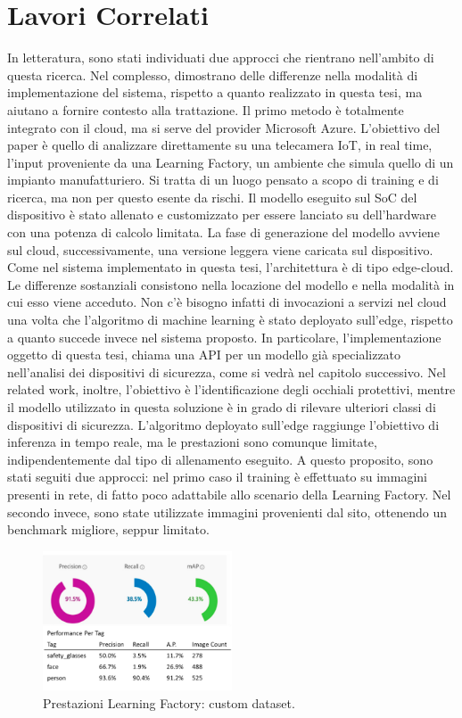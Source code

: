 \section{Lavori Correlati}

In letteratura, sono stati individuati due approcci che rientrano nell'ambito di questa ricerca. Nel complesso, dimostrano delle differenze nella modalità di implementazione del sistema, rispetto a quanto realizzato in questa tesi, ma aiutano a fornire contesto alla trattazione. Il primo metodo \cite{b7edgeppe} è totalmente integrato con il cloud, ma si serve del provider Microsoft Azure. L'obiettivo del paper è quello di analizzare direttamente su una telecamera IoT, in real time, l'input proveniente da una Learning Factory, un ambiente che simula quello di un impianto manufatturiero. Si tratta di un luogo pensato a scopo di training e di ricerca, ma non per questo esente da rischi. Il modello eseguito sul SoC del dispositivo è stato allenato e customizzato per essere lanciato su dell'hardware con una potenza di calcolo limitata. La fase di generazione del modello avviene sul cloud, successivamente, una versione leggera viene caricata sul dispositivo. Come nel sistema implementato in questa tesi, l'architettura è di tipo edge-cloud. Le differenze sostanziali consistono nella locazione del modello e nella modalità in cui esso viene acceduto. Non c'è bisogno infatti di invocazioni a servizi nel cloud una volta che l'algoritmo di machine learning è stato deployato sull'edge, rispetto a quanto succede invece nel sistema proposto. In particolare, l'implementazione oggetto di questa tesi, chiama una API per un modello già specializzato nell'analisi dei dispositivi di sicurezza, come si vedrà nel capitolo successivo. Nel related work, inoltre, l'obiettivo è l'identificazione degli occhiali protettivi, mentre il modello utilizzato in questa soluzione è in grado di rilevare ulteriori classi di dispositivi di sicurezza. L'algoritmo deployato sull'edge raggiunge l'obiettivo di inferenza in tempo reale, ma le prestazioni sono comunque limitate, indipendentemente dal tipo di allenamento eseguito. A questo proposito, sono stati seguiti due approcci: nel primo caso il training è effettuato su immagini presenti in rete, di fatto poco adattabile allo scenario della Learning Factory. Nel secondo invece, sono state utilizzate immagini provenienti dal sito, ottenendo un benchmark migliore, seppur limitato.

\begin{figure}[htbp]
    \centering
    \includegraphics[width=0.5\textwidth]{figures/relw1.png}
    \caption{Prestazioni Learning Factory: custom dataset.}
    \label{fig:relw1}
\end{figure}


